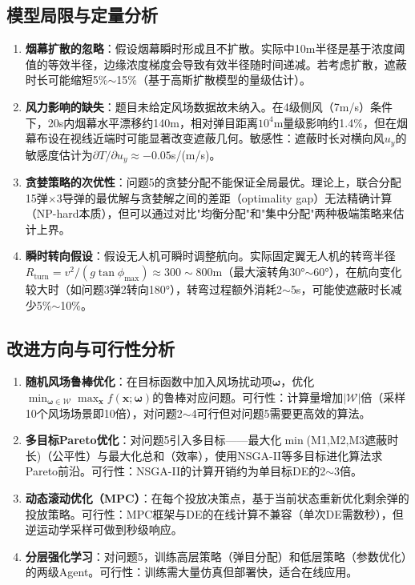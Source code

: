 \documentclass[12pt,a4paper]{ctexart}
\begin{document}
\subsection{模型局限与定量分析}

\begin{enumerate}[label=(\arabic*)]
    \item \textbf{烟幕扩散的忽略}：假设烟幕瞬时形成且不扩散。实际中10m半径是基于浓度阈值的等效半径，边缘浓度梯度会导致有效半径随时间递减。若考虑扩散，遮蔽时长可能缩短5\%$\sim$15\%（基于高斯扩散模型的量级估计\cite{smoke_military}）。
    \item \textbf{风力影响的缺失}：题目未给定风场数据故未纳入。在4级侧风（7m/s）条件下，20s内烟幕水平漂移约140m，相对弹目距离$10^4$m量级影响约1.4\%，但在烟幕布设在视线近端时可能显著改变遮蔽几何。敏感性：遮蔽时长对横向风$u_y$的敏感度估计为$\partial T/\partial u_y\approx -0.05$s/(m/s)。
    \item \textbf{贪婪策略的次优性}：问题5的贪婪分配不能保证全局最优。理论上，联合分配15弹$\times$3导弹的最优解与贪婪解之间的差距（optimality gap）无法精确计算（NP-hard本质），但可以通过对比"均衡分配"和"集中分配"两种极端策略来估计上界。
    \item \textbf{瞬时转向假设}：假设无人机可瞬时调整航向。实际固定翼无人机的转弯半径$R_{\text{turn}}=v^2/(g\tan\phi_{\max})\approx300\sim800$m（最大滚转角30°$\sim$60°），在航向变化较大时（如问题3弹2转向180°），转弯过程额外消耗2$\sim$5s，可能使遮蔽时长减少5\%$\sim$10\%。
\end{enumerate}

\subsection{改进方向与可行性分析}

\begin{enumerate}[label=(\arabic*)]
    \item \textbf{随机风场鲁棒优化}：在目标函数中加入风场扰动项$\boldsymbol{\omega}$，优化$\min_{\boldsymbol{\omega}\in\mathcal{W}}\max_{\mathbf{x}} f(\mathbf{x};\boldsymbol{\omega})$的鲁棒对应问题。可行性：计算量增加$|\mathcal{W}|$倍（采样10个风场场景即10倍），对问题2$\sim$4可行但对问题5需要更高效的算法。
    \item \textbf{多目标Pareto优化}：对问题5引入多目标——最大化$\min$(M1,M2,M3遮蔽时长)（公平性）与最大化总和（效率），使用NSGA-II等多目标进化算法求Pareto前沿。可行性：NSGA-II的计算开销约为单目标DE的2$\sim$3倍。
    \item \textbf{动态滚动优化（MPC）}：在每个投放决策点，基于当前状态重新优化剩余弹的投放策略。可行性：MPC框架与DE的在线计算不兼容（单次DE需数秒），但逆运动学采样可做到秒级响应。
    \item \textbf{分层强化学习}：对问题5，训练高层策略（弹目分配）和低层策略（参数优化）的两级Agent。可行性：训练需大量仿真但部署快，适合在线应用。
\end{enumerate}
\end{document}
